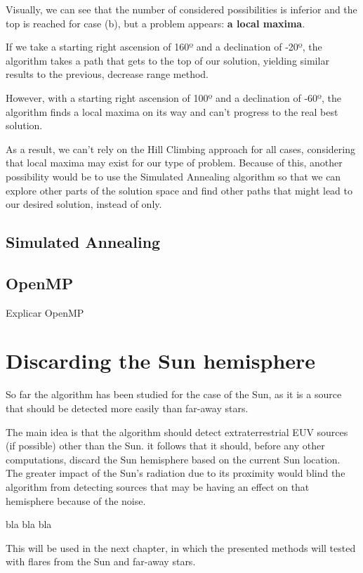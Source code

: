 Visually, we can see that the number of considered possibilities is inferior and the top is reached for case (b), but a problem appears: \textbf{a local maxima}.

If we take a starting right ascension of 160º and a declination of -20º, the algorithm takes a path that gets to the top of our solution, yielding similar results to the previous, decrease range method.

However, with a starting right ascension of 100º and a declination of -60º, the algorithm finds a local maxima on its way and can't progress to the real best solution.

As a result, we can't rely on the Hill Climbing approach for all cases, considering that local maxima may exist for our type of problem. Because of this, another possibility would be to use the Simulated Annealing algorithm so that we can explore other parts of the solution space and find other paths that might lead to our desired solution, instead of only.

\subsection{Simulated Annealing}

\subsection{OpenMP}

Explicar OpenMP

\section{Discarding the Sun hemisphere}

So far the algorithm has been studied for the case of the Sun, as it is a source that should be detected more easily than far-away stars. 

The main idea is that the algorithm should detect extraterrestrial EUV sources (if possible) other than the Sun. it follows that it should, before any other computations, discard the Sun hemisphere based on the current Sun location. The greater impact of the Sun's radiation due to its proximity would blind the algorithm from detecting sources that may be having an effect on that hemisphere because of the noise.


bla bla bla

This will be used in the next chapter, in which the presented methods will tested with flares from the Sun and far-away stars.